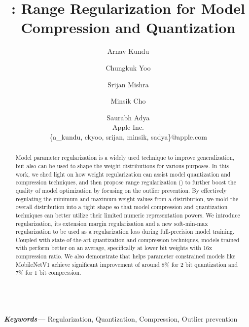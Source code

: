 \documentclass[10pt,twocolumn,letterpaper]{article}
\providecommand{\keywords}[1]
{
  \small	
  \textbf{\textit{Keywords---}} #1
}
\begin{document}
\title{: Range Regularization for Model Compression and Quantization}

\author{Arnav Kundu
\and
Chungkuk Yoo
\and
Srijan Mishra
\and
Minsik Cho
\and
Saurabh Adya\\
Apple Inc.\\
\{a\_kundu, ckyoo, srijan, minsik, sadya\}@apple.com
}

\maketitle
\vspace{0.3in}
\begin{abstract}Model parameter regularization is a widely used technique to improve generalization, but also can be used to shape the weight distributions for various purposes. In this work, we shed light on how weight regularization can assist model quantization and compression techniques, and then propose range regularization () to further boost the quality of model optimization by focusing on the outlier prevention.
By effectively regulating the minimum and maximum weight values from a distribution, we mold the overall distribution into a tight shape so that model compression and quantization techniques can better utilize their limited numeric representation powers. We introduce  regularization, its extension margin regularization and a new soft-min-max regularization to be used as a regularization loss during full-precision model training. Coupled with state-of-the-art quantization and compression techniques, models trained with  perform better on an average, specifically at lower bit weights with 16x compression ratio. We also demonstrate that  helps parameter constrained models like MobileNetV1 achieve significant improvement of around 8\% for 2 bit quantization and 7\% for 1 bit compression.
\end{abstract}\\
\keywords{Regularization, Quantization, Compression, Outlier prevention}
\end{document}
